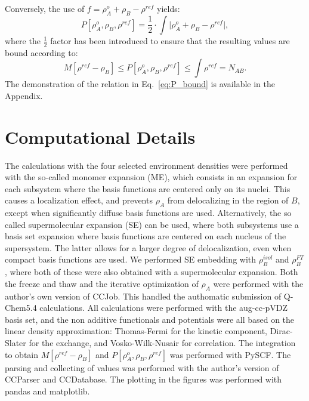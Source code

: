\documentclass[journal=jctcce,manuscript=article, layout=twocolumn]{achemso}
\begin{document}
Conversely, the use of $f= \rho^{o}_{A} + \rho_B - \rho^{ref}$ yields:
\begin{equation}
 P[\rho^{o}_A, \rho_B, \rho^{ref}] = \frac{1}{2} \cdot \int \vert \rho^{o}_A + \rho_B - \rho^{ref} \vert, 
\end{equation}
where the $\frac{1}{2}$ factor has been introduced to ensure that the resulting values are bound according to:
\begin{equation} \label{eq:P_bound}
 M[\rho^{ref} - \rho_B] \leq P[\rho^{o}_A, \rho_B, \rho^{ref}] \leq \int \rho^{ref} = N_{AB}.
\end{equation}
The demonstration of the relation in Eq.~\ref{eq:P_bound} is available in the Appendix.

\section{Computational Details} \label{sect:comp_det}
The calculations with the four selected environment densities were performed with the so-called monomer expansion (ME), which consists in an expansion for each subsystem where the basis functions are centered only on its nuclei. This causes a localization effect, and prevents $\rho_A$ from delocalizing in the region of $B$, except when significantly diffuse basis functions are used.
Alternatively, the so called supermolecular expansion (SE) can be used, where both subsystems use a basis set expansion where basis functions are centered on each nucleus of the supersystem. The latter allows for a larger degree of delocalization, even when compact basis functions are used. We performed SE embedding with $\rho_B^{isol}$ and $\rho_B^{FT}$, where both of these were also obtained with a supermolecular expansion.
Both the freeze and thaw and the iterative optimization of $\rho_A$ were performed with the author's own version\cite{CCJob_Ricardi} of CCJob\cite{CCJob_Zech}. This handled the authomatic submission of Q-Chem5.4\cite{Qchem54} calculations. 
All calculations were performed with the aug-cc-pVDZ basis set, and the non additive functionals and potentials were all based on the linear density approximation: Thomas-Fermi\cite{Thomas1927, Fermi1928} for the kinetic component, Dirac-Slater\cite{Slater1929} for the exchange, and Vosko-Wilk-Nusair\cite{Vosko1980} for correlation.
The integration to obtain $M[\rho^{ref} - \rho_B]$ and $P[\rho^{o}_A, \rho_B, \rho^{ref}]$ was performed with  PySCF\cite{PYSCF}.
The parsing and collecting of values was performed with the author's version\cite{CCParser_Ricardi} of CCParser\cite{CCParser_Zech} and CCDatabase\cite{CCDatabase}. The plotting in the figures was performed with pandas\cite{PANDAS} and matplotlib\cite{Hunter2007}.
\end{document}
